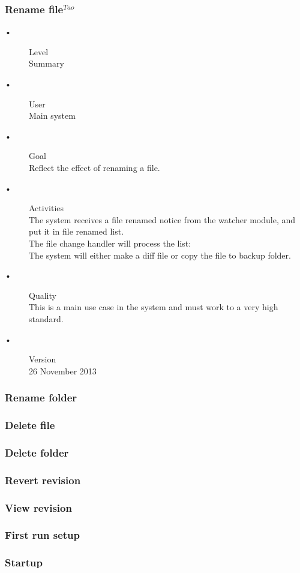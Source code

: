 \documentclass[12pt,a4paper]{article}
\begin{document}
\subsubsection{Rename file$^{Tao}$}
\begin{description}
	\item[•] Level \hfill \\
	Summary
	\item[•] User \hfill \\
	Main system
	\item[•] Goal \hfill \\
	Reflect the effect of renaming a file.
	\item[•] Activities \hfill \\
	The system receives a file renamed notice from the watcher module, and put it in file renamed list.\\
	The file change handler will process the list: \\
	The system will either make a diff file or copy the file to backup folder.
	\item[•] Quality \hfill \\
	This is a main use case in the system and must work to a very high standard.
	\item[•] Version \hfill \\
	26 November 2013	
\end{description}
\subsubsection{Rename folder}
\subsubsection{Delete file}
\subsubsection{Delete folder}
\subsubsection{Revert revision}
\subsubsection{View revision}
\subsubsection{First run setup}
\subsubsection{Startup}
\end{document}

